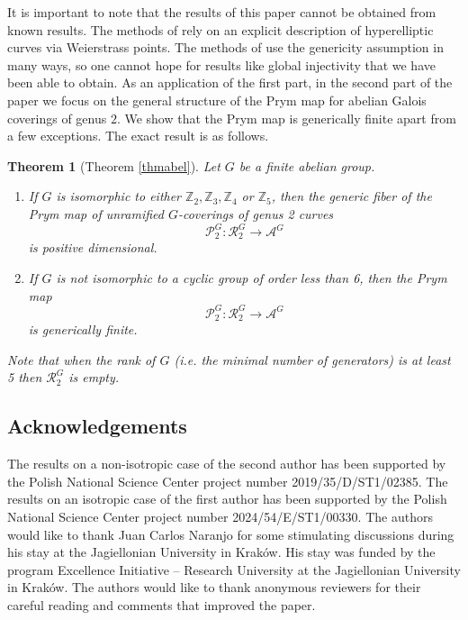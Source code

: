 \documentclass{amsart}
\newtheorem{thm}{Theorem}[section]
\theoremstyle{remark}
\numberwithin{equation}{section}
\begin{document}
It is important to note that the results of this paper cannot be obtained from known results. The methods of \cite{BO19} rely on an explicit description of hyperelliptic curves via Weierstrass points. The methods of \cite{sophie, naranjo2024simplicityjacobiansautomorphisms} use the genericity assumption in many ways, so one cannot hope for results like global injectivity that we have been able to obtain.
As an application of the first part, in the second part of the paper we focus on the general structure of the Prym map for abelian Galois coverings of genus \(2\). We show that the Prym map is generically finite apart from a few exceptions. The exact result is as follows. 
\begin{thm}[Theorem \ref{thmabel}]
    Let $G$ be a finite abelian group.  
    \begin{enumerate}
        \item If $G$ is isomorphic to either $\mathbb{Z}_2, \mathbb{Z}_3, \mathbb{Z}_4$ or $\mathbb{Z}_5$, then the generic fiber of the Prym map of unramified $G$-coverings of genus 2 curves $$\mathcal{P}_2^{G}: \mathcal{R}_2^{G} \to \mathcal{A}^{G}$$ is positive dimensional. 
        \item If $G$ is not isomorphic to a cyclic group of order less than 6, then the Prym map $$\mathcal{P}_2^{G}: \mathcal{R}_2^{G} \to \mathcal{A}^{G}$$ is generically finite. 
    \end{enumerate}
    Note that when the rank of $G$ (i.e. the minimal number of generators) is at least 5 then $\mathcal{R}_2^{G}$ is empty.
\end{thm}



\subsection*{Acknowledgements}
The results on a non-isotropic case of the second author has been supported by the Polish National Science Center project number 2019/35/D/ST1/02385. The results on an isotropic case of the first author has been supported by the Polish National Science Center project number 2024/54/E/ST1/00330.
The authors would like to thank Juan Carlos Naranjo for some stimulating discussions during his stay at the Jagiellonian University in Kraków. His stay was funded by the program Excellence Initiative –
Research University at the Jagiellonian University in Kraków. 
The authors would like to thank anonymous reviewers for their careful reading and comments that improved the paper.
\end{document}
